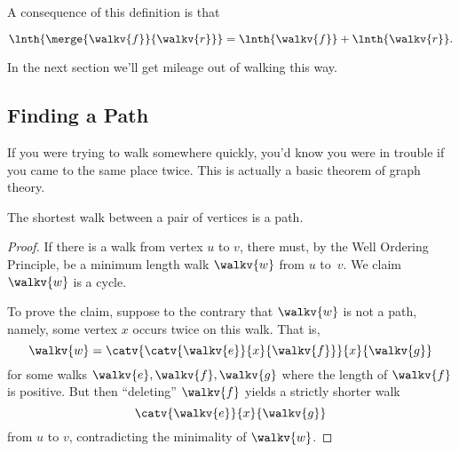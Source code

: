 \iffalse
 Here's a precise definition:
\begin{definition}
If a walk $\walkv{f}$ ends at a vertex $v$ and a walk $\walkv{r}$
begins at the same vertex $v$, then the \term{$v$-merge} of
$\walkv{f}$ with $\walkv{r}$, written,
\[
\catv{\walkv{f}}{v}{\walkv{r}},
\]
is the walk whose vertex sequence is the vertex sequence of
$\walkv{f}$ concatenated with the vertex sequence of $\walkv{r}$
without its initial $v$.  That is, if
\begin{align*}
\walkv{r} & = v\,\vec{\alpha},
\end{align*}
for some finite sequence $\vec{\alpha}$ of vertices,
then
\[
\catv{\walkv{f}}{v}{\walkv{r}} \eqdef  \walkv{f}\alpha.
\]
\end{definition}
\fi

A consequence of this definition is that
\begin{lemma}\label{sumoflengths}
\[
\lnth{\merge{\walkv{f}}{\walkv{r}}} = \lnth{\walkv{f}} + \lnth{\walkv{r}}.
\]
\end{lemma}
In the next section we'll get mileage out of walking this way.

\subsection{Finding a Path}
If you were trying to walk somewhere quickly, you'd know you were in
trouble if you came to the same place twice.  This is actually a basic
theorem of graph theory.

\begin{theorem}\label{shortestwalk_thm}
The shortest walk between a pair of vertices is a path.
\end{theorem}

\begin{proof}
  If there is a walk from vertex $u$ to $v$, there must, by the Well
  Ordering Principle, be a minimum length walk $\walkv{w}$ from $u$
  to~$v$.  We claim $\walkv{w}$ is a cycle.

  To prove the claim, suppose to the contrary that $\walkv{w}$ is not a
  path, namely, some vertex $x$ occurs twice on this walk.  That is,
\[
\walkv{w} = \catv{\catv{\walkv{e}}{x}{\walkv{f}}}{x}{\walkv{g}}
\]
for some walks $\walkv{e}, \walkv{f}, \walkv{g}$ where the length of
$\walkv{f}$ is positive.  But then ``deleting'' $\walkv{f}$ yields a
strictly shorter walk
\[
\catv{\walkv{e}}{x}{\walkv{g}}
\]
from $u$ to $v$, contradicting the minimality of $\walkv{w}$.
\end{proof}

